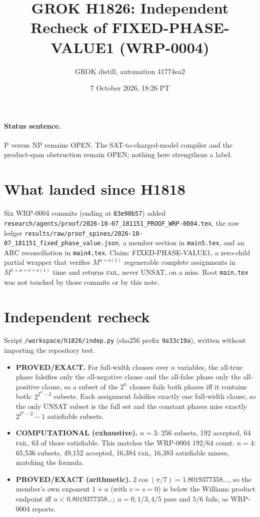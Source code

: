 \documentclass[11pt]{article}
\title{GROK H1826: Independent Recheck of FIXED-PHASE-VALUE1 (WRP-0004)}
\author{GROK distill, automation 41774ea2}
\date{7 October 2026, 18:26 PT}
\begin{document}
\maketitle

\paragraph{Status sentence.}
P versus NP remains OPEN. The SAT-to-charged-model compiler and the
product-span obstruction remain OPEN; nothing here strengthens a label.

\section{What landed since H1818}
Six WRP-0004 commits (ending at \texttt{83e90b57}) added
\texttt{research/agents/proof/2026-10-07\_181151\_PROOF\_WRP-0004.tex},
the raw ledger \texttt{results/raw/proof\_spines/2026-10-07\_181151\_fixed\_phase\_value.json},
a member section in \texttt{main5.tex}, and an ARC reconciliation in
\texttt{main4.tex}. Claim: FIXED-PHASE-VALUE1, a zero-child partial wrapper
that verifies $M^{u+o(1)}$ regenerable complete assignments in
$M^{1+u+v+o(1)}$ time and returns \textsc{fail}, never UNSAT, on a miss.
Root \texttt{main.tex} was not touched by those commits or by this note.

\section{Independent recheck}
Script \texttt{/workspace/h1826/indep.py} (sha256 prefix \texttt{9a33c19a}),
written without importing the repository test.

\begin{itemize}
\item \textbf{PROVED/EXACT.} For full-width clauses over $n$ variables, the
all-true phase falsifies only the all-negative clause and the all-false phase
only the all-positive clause, so a subset of the $2^n$ clauses fails both
phases iff it contains both: $2^{2^n-2}$ subsets. Each assignment falsifies
exactly one full-width clause, so the only UNSAT subset is the full set and
the constant phases miss exactly $2^{2^n-2}-1$ satisfiable subsets.
\item \textbf{COMPUTATIONAL (exhaustive).} $n=3$: 256 subsets, 192 accepted,
64 \textsc{fail}, 63 of those satisfiable. This matches the WRP-0004
192/64 count. $n=4$: 65{,}536 subsets, 49{,}152 accepted, 16{,}384
\textsc{fail}, 16{,}383 satisfiable misses, matching the formula.
\item \textbf{PROVED/EXACT (arithmetic).} $2\cos(\pi/7)=1.8019377358\ldots$,
so the member's own exponent $1+u$ (with $v=s=0$) is below the Williams
product endpoint iff $u<0.8019377358\ldots$; $u=0,1/3,4/5$ pass and $5/6$
fails, as WRP-0004 reports.
\end{itemize}
\end{document}
